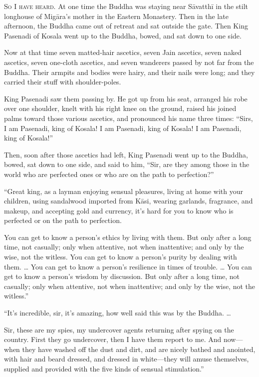 \documentclass[12pt,openany]{book}%
\newcommand*{\scevam}[1]{\textsc{#1}}
\begin{document}
\scevam{So I have heard. }At one time the Buddha was staying near \textsanskrit{Sāvatthī} in the stilt longhouse of \textsanskrit{Migāra}’s mother in the Eastern Monastery. Then in the late afternoon, the Buddha came out of retreat and sat outside the gate. Then King Pasenadi of Kosala went up to the Buddha, bowed, and sat down to one side. 

Now at that time seven matted-hair ascetics, seven Jain ascetics, seven naked ascetics, seven one-cloth ascetics, and seven wanderers passed by not far from the Buddha. Their armpits and bodies were hairy, and their nails were long; and they carried their stuff with shoulder-poles. 

King Pasenadi saw them passing by. He got up from his seat, arranged his robe over one shoulder, knelt with his right knee on the ground, raised his joined palms toward those various ascetics, and pronounced his name three times: “Sirs, I am Pasenadi, king of Kosala! I am Pasenadi, king of Kosala! I am Pasenadi, king of Kosala!” 

Then, soon after those ascetics had left, King Pasenadi went up to the Buddha, bowed, sat down to one side, and said to him, “Sir, are they among those in the world who are perfected ones or who are on the path to perfection?” 

“Great king, as a layman enjoying sensual pleasures, living at home with your children, using sandalwood imported from \textsanskrit{Kāsi}, wearing garlands, fragrance, and makeup, and accepting gold and currency, it’s hard for you to know who is perfected or on the path to perfection. 

You can get to know a person’s ethics by living with them. But only after a long time, not casually; only when attentive, not when inattentive; and only by the wise, not the witless. You can get to know a person’s purity by dealing with them. … You can get to know a person’s resilience in times of trouble. … You can get to know a person’s wisdom by discussion. But only after a long time, not casually; only when attentive, not when inattentive; and only by the wise, not the witless.” 

“It’s incredible, sir, it’s amazing, how well said this was by the Buddha. … 

Sir, these are my spies, my undercover agents returning after spying on the country. First they go undercover, then I have them report to me. And now—when they have washed off the dust and dirt, and are nicely bathed and anointed, with hair and beard dressed, and dressed in white—they will amuse themselves, supplied and provided with the five kinds of sensual stimulation.” 
\end{document}
